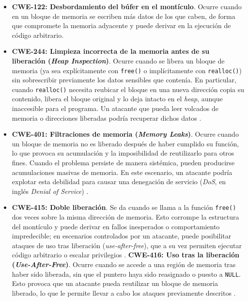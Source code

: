 \documentclass[12pt, a4paper, twoside]{article}
\begin{document}
\begin{itemize}
	\item \textbf{CWE-122: Desbordamiento del búfer en el montículo}. Ocurre cuando en un bloque de memoria se escriben más datos de los que caben, de forma que compromete la memoria adyacente y puede derivar en la ejecución de código arbitrario.
	
	
	\item \textbf{CWE-244: Limpieza incorrecta de la memoria antes de su liberación (\textit{Heap Inspection})}.
	Ocurre cuando se libera un bloque de memoria (ya sea explícitamente con \texttt{free()} o implícitamente con \texttt{realloc()}) sin sobrescribir previamente los datos sensibles que contenía. En particular, cuando \texttt{realloc()} necesita reubicar el bloque en una nueva dirección copia su contenido, libera el bloque original y lo deja intacto en el \textit{heap}, aunque inaccesible para el programa. Un atacante que pueda leer volcados de memoria o direcciones liberadas podría recuperar dichos datos \cite{mitre-cwe-244}.
		
	\item \textbf{CWE-401: Filtraciones de memoria (\textit{Memory Leaks})}.
	Ocurre cuando un bloque de memoria no es liberado después de haber cumplido su función, lo que provoca su acumulación y la imposibilidad de reutilizarlo para otros fines. Cuando el problema persiste de manera sistémica, pueden producirse acumulaciones masivas de memoria. En este escenario, un atacante podría explotar esta debilidad para causar una denegación de servicio (\textit{DoS}, en inglés \textit{Denial of Service}) \cite{mitre-cwe-401}.
	
	\item \textbf{CWE-415: Doble liberación}. Se da cuando se llama a la función \texttt{free()} dos veces sobre la misma dirección de memoria. Esto corrompe la estructura del montículo y puede derivar en fallos inesperados o comportamiento impredecible; en escenarios controlados por un atacante, puede posibilitar ataques de uso tras liberación (\textit{use-after-free}),  que a su vez permiten ejecutar código arbitrario o escalar privilegios \cite{mitre-cwe-415}.
	\subitem \textbf{CWE-416: Uso tras la liberación (\textit{Use-After-Free})}. Ocurre cuando se accede a una región de memoria tras haber sido liberada, sin que el puntero haya sido reasignado o puesto a \texttt{NULL}. Esto provoca que un atacante pueda reutilizar un bloque de memoria liberado, lo que le permite llevar a cabo los ataques previamente descritos \cite{mitre-cwe-416}.
	

\end{itemize}
\end{document}

